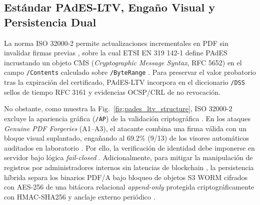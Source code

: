 \documentclass[runningheads,twocolumn]{llncs}
\begin{document}
\subsection{Estándar PAdES-LTV, Engaño Visual y Persistencia Dual}
La norma ISO 32000-2 permite actualizaciones incrementales en PDF sin invalidar firmas previas \cite{iso32000,heher2027}, sobre la cual ETSI EN 319 142-1 define PAdES incrustando un objeto CMS (\textit{Cryptographic Message Syntax}, RFC 5652) en el campo \texttt{/Contents} calculado sobre \texttt{/ByteRange} \cite{etsi2024,rfc5652,doynov2026}. Para preservar el valor probatorio tras la expiración del certificado, PAdES-LTV incorpora en el diccionario \texttt{/DSS} sellos de tiempo RFC 3161 \cite{rfc3161} y evidencias OCSP/CRL de no revocación.

No obstante, como muestra la Fig.~\ref{fig:pades_ltv_structure}, ISO 32000-2 excluye la apariencia gráfica (\texttt{/AP}) de la validación criptográfica \cite{iso32000,heher2027}. En los ataques \textit{Genuine PDF Forgeries} (A1--A3), el atacante combina una firma válida con un bloque visual suplantado, engañando al 69.2\% (9/13) de los visores automáticos auditados en laboratorio \cite{heher2027,kim2025}. Por ello, la verificación de identidad debe imponerse en servidor bajo lógica \textit{fail-closed} \cite{doynov2026,heher2027}. Adicionalmente, para mitigar la manipulación de registros por administradores internos sin latencias de blockchain \cite{han2025}, la persistencia híbrida separa los binarios PDF/A bajo bloqueo de objetos S3 WORM cifrados con AES-256 de una bitácora relacional \textit{append-only} protegida criptográficamente con HMAC-SHA256 y anclaje externo periódico \cite{soni2026,doynov2026}.
\end{document}
